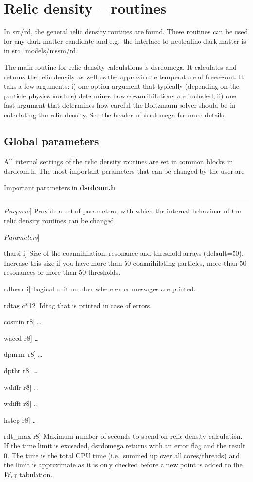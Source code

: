 \documentclass[a4paper,10pt,oneside]{book}
\newcommand{\code}[1]{\ft{#1}}
\newenvironment{allsubs}{\begin{list}{}{\setlength{\labelsep}{0.0 cm}
\setlength{\labelwidth}{0.0 cm} \setlength{\leftmargin}{0.0 cm}
\setlength{\itemsep}{0.6ex} \setlength{\topsep}{\itemsep}}}{\end{list}}
\newenvironment{subs}{\begin{list}{}{\setlength{\labelwidth}{2.0 cm}
\setlength{\labelsep}{0.5 cm} \setlength{\leftmargin}{3.0 cm}
\setlength{\itemsep}{0.0 cm} \setlength{\parsep}{0.0 cm}
\setlength{\topsep}{0.0 cm} \setlength{\parskip}{0.0 cm}}}{\end{list}}
\newenvironment{sub}[1]%
{\begin{allsubs}\item \tw{#1\raisebox{-0.5ex}{}}\hrule\begin{subs}}
{\end{subs}\end{allsubs}}
\newcommand{\lft}[1]{\makebox[2.0 cm][l]{\em #1}}   %
\newcommand{\lfv}[1]{\makebox[1.5 cm][l]{\sffamily #1}}   %
\newcommand{\itit}[1]{\item[\lft{#1}]}
\newcommand{\itv}[2]{\item[\lfv{#1 \hfill #2}]}
\newcommand{\tw}[1]{\textsf{#1}}
\newcommand{\ft}[1]{\textsf{#1}}
\newcommand{\ftb}[1]{{\bfseries \sffamily #1}}
\begin{document}
\section{Relic density -- routines}

In \ft{src/rd}, the general relic density routines are found. These
routines can be used for any dark matter candidate and e.g.\ the interface
to neutralino dark matter is in \ft{src\_models/mssm/rd}. 

The main routine for relic density calculations is \ft{dsrdomega}. It calculates and returns the relic density as well as the approximate temperature of freeze-out. It taks a few arguments: i) one \code{option} argument that typically (depending on the particle physics module) determines how co-annihilations are included, ii) one \code{fast} argument that determines how careful the Boltzmann solver should be in calculating the relic density. See the header of \ft{dsrdomega} for more details.


\subsection{Global parameters}

All internal settings of the relic density routines are set in common
blocks in \ft{dsrdcom.h}. The most important parameters that can be
changed by the user are

\begin{sub}{Important parameters in \ftb{dsrdcom.h}}
  \itit{Purpose:} Provide a set of parameters, with which the internal
  behaviour of the relic density routines can be changed.
  \itit{Parameters}
  \itv{tharsi}{i} Size of the coannihilation, resonance and threshold
    arrays (default=50). Increase this size if you have more than 50
    coannihilating particles, more than 50 resonances or more than 50
    thresholds.
  \itv{rdluerr}{i} Logical unit number where error messages are
    printed.
  \itv{rdtag}{c*12} Idtag that is printed in case of errors.
  \itv{cosmin}{r8} \ldots
  \itv{waccd}{r8} \ldots
  \itv{dpminr}{r8} \ldots
  \itv{dpthr}{r8} \ldots
  \itv{wdiffr}{r8} \ldots
  \itv{wdifft}{r8} \ldots
  \itv{hstep}{r8} \ldots
  \itv{rdt\_max}{r8} Maximum number of seconds to spend on relic density calculation. If the time limit is exceeded, \ft{dsrdomega} returns with an error flag and the result 0. The time is the total CPU time (i.e.\ summed up over all cores/threads) and the limit is approximate as it is only checked before a new point is added to the $W_{\rm eff}$ tabulation.
\end{sub}
\end{document}
